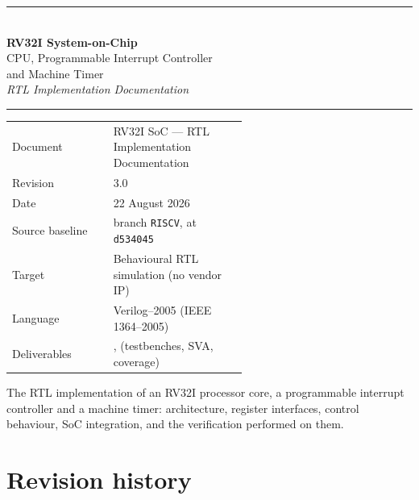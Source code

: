 \documentclass[11pt,openany]{report}
\newcommand{\docrevision}{3.0}
\newcommand{\docdate}{22 August 2026}
\newcommand{\docbaseline}{branch \texttt{RISCV}, at \texttt{d534045}}
\begin{document}
\begin{titlepage}
\centering
\vspace*{22mm}

{\color{accent}\rule{\linewidth}{1.2pt}}\\[6mm]
{\Huge\bfseries RV32I System-on-Chip}\\[4mm]
{\LARGE CPU, Programmable Interrupt Controller\\[2mm] and Machine Timer}\\[6mm]
{\Large\itshape RTL Implementation Documentation}\\[4mm]
{\color{accent}\rule{\linewidth}{1.2pt}}

\vfill

\begin{tabular}{@{}lL{0.58\linewidth}@{}}
\toprule
Document        & RV32I SoC --- RTL Implementation Documentation \\
Revision        & \docrevision \\
Date            & \docdate \\
Source baseline & \docbaseline \\
Target          & Behavioural RTL simulation (no vendor IP) \\
Language        & Verilog--2005 (IEEE 1364--2005) \\
Deliverables    & ,  (testbenches, SVA, coverage) \\
\bottomrule
\end{tabular}

\vspace{12mm}

\begin{minipage}{0.86\linewidth}
\small
The RTL implementation of an RV32I processor core, a programmable interrupt
controller and a machine timer: architecture, register interfaces, control
behaviour, SoC integration, and the verification performed on them.
\end{minipage}

\vspace{18mm}
\end{titlepage}

\setcounter{page}{1}

\chapter*{Revision history}
\end{document}
